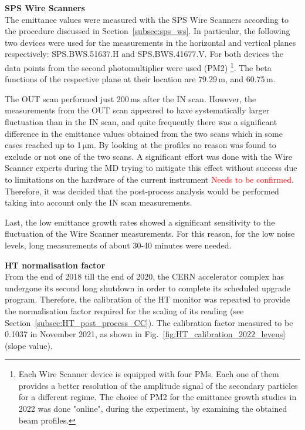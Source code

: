 \textbf{SPS Wire Scanners}\\
The emittance values were measured with the SPS Wire Scanners according to the procedure discussed in Section~\ref{subsec:sps_ws}. In particular, the following two devices were used for the measurements in the horizontal and vertical planes respectively: SPS.BWS.51637.H and SPS.BWS.41677.V. For both devices the data points from the second photomultiplier were used (PM2) \footnote{Each Wire Scanner device is equipped with four PMs. Each one of them provides a better resolution of the amplitude signal of the secondary particles for a different regime. The choice of PM2 for the emittance growth studies in 2022 was done "online", during the experiment, by examining the obtained beam profiles.}. The beta functions of the respective plane at their location are 79.29\,m, and  60.75\,m. 

The OUT scan performed just 200\,ms after the IN scan. However, the measurements from the OUT scan appeared to have systematically larger fluctuation than in the IN scan, and quite frequently there was a significant difference in the emittance values obtained from the two scans which in some cases reached up to 1\,$\mathrm{\mu m}$. By looking at the profiles no reason was found to exclude or not one of the two scans. A significant effort was done with the Wire Scanner experts during the MD trying to mitigate this effect without success due to limitations on the hardware of the current instrument \textcolor{red}{Needs to be confirmed}. Therefore, it was decided that the post-process analysis would be performed taking into account only the IN scan measurements.

Last, the low emittance growth rates showed a significant sensitivity to the fluctuation of the Wire Scanner measurements. For this reason, for the low noise levels, long measurements of about 30-40 minutes were needed.

\textbf{HT normalisation factor}\\
From the end of 2018 till the end of 2020, the CERN accelerator complex has undergone its second long shutdown in order to complete its scheduled upgrade program. Therefore, the calibration of the HT monitor was repeated to provide the normalisation factor required for the scaling of its reading (see Section~\ref{subsec:HT_post_process_CC}). The calibration factor measured to be 0.1037 in November 2021, as shown in Fig.~\ref{fig:HT_calibration_2022_levens} (slope value).

